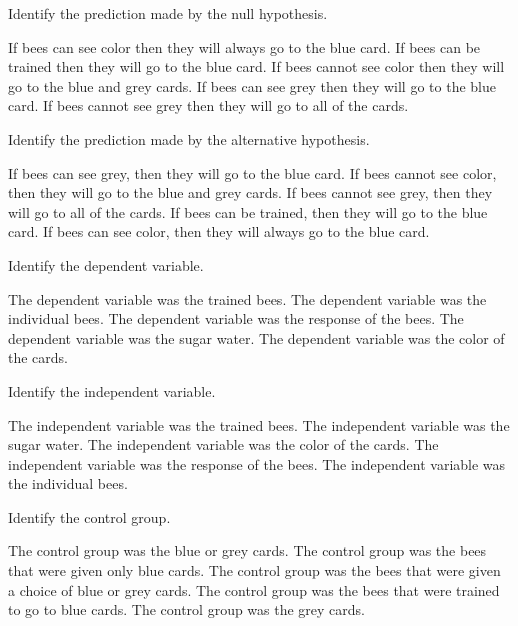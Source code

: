 \question
Identify the prediction made by the null hypothesis.

\begin{choices}
\choice If bees can see color then they will always go to the blue card.
\choice If bees can be trained then they will go to the blue card.
\correctchoice If bees cannot see color then they will go to the blue and grey cards.
\choice If bees can see grey then they will go to the blue card.
\choice If bees cannot see grey then they will go to all of the cards.
\end{choices}

\question
Identify the prediction made by the alternative hypothesis.

\begin{choices}
\choice If bees can see grey, then they will go to the blue card.
\choice If bees cannot see color, then they will go to the blue and grey cards.
\choice If bees cannot see grey, then they will go to all of the cards.
\choice If bees can be trained, then they will go to the blue card.
\correctchoice If bees can see color, then they will always go to the blue card.
\end{choices}

\question
Identify the dependent variable.

\begin{choices}
\choice The dependent variable was the trained bees.
\choice The dependent variable was the individual bees.
\correctchoice The dependent variable was the response of the bees.
\choice The dependent variable was the sugar water.
\choice The dependent variable was the color of the cards.
\end{choices}

\question
Identify the independent variable.

\begin{choices}
\choice The independent variable was the trained bees.
\choice The independent variable was the sugar water.
\correctchoice The independent variable was the color of the cards.
\choice The independent variable was the response of the bees.
\choice The independent variable was the individual bees.
\end{choices}

\newpage


\question
Identify the control group.

\begin{choices}
\choice The control group was the blue or grey cards.
\correctchoice The control group was the bees that were given only blue cards.
\choice The control group was the bees that were given a choice of blue or grey cards.
\choice The control group was the bees that were trained to go to blue cards.
\choice The control group was the grey cards.
\end{choices}

